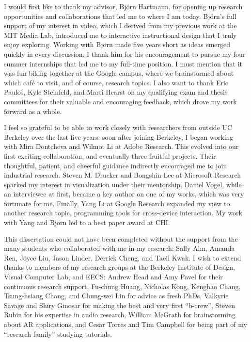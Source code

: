 \begin{acknowledgements}

I would first like to thank my advisor, Bj\"orn Hartmann, for opening up research opportunities and collaborations that led me to where I am today.
%
Bj\"orn's full support of my interest in video, which I derived from my previous work at the MIT Media Lab, introduced me to interactive instructional design that I truly enjoy exploring. Working with Bj\"orn made five years short as ideas emerged quickly in every discussion. I thank him for his encouragement to pursue my four summer internships that led me to my full-time position. I must mention that it was fun biking together at the Google campus, where we brainstormed about which caf\'{e} to visit, and of course, research topics.
I also want to thank Eric Paulos, Kyle Steinfeld, and Marti Hearst on my qualifying exam and thesis committees for their valuable and encouraging feedback, which drove my work forward as a whole.

I feel so grateful to be able to work closely with researchers from outside UC Berkeley over the last five years: soon after joining Berkeley, I began working with Mira Dontcheva and Wilmot Li at Adobe Research. This evolved into our first exciting collaboration, and eventually three fruitful projects. Their thoughtful, patient, and cheerful guidance indirectly encouraged me to join industrial research.
%
Steven M. Drucker and Bongshin Lee at Microsoft Research sparked my interest in visualization under their mentorship.
%
Daniel Vogel, while an interviewee at first, became a key author on one of my works, which was very fortunate for me.
%
Finally, Yang Li at Google Research expanded my view to another research topic, programming tools for cross-device interaction. My work with Yang and Bj\"orn led to a best paper award at CHI.

This dissertation could not have been completed without the support from the many students who collaborated with me in my research: Sally Ahn, Amanda Ren, Joyce Liu, Jason Linder, Derrick Cheng, and Taeil Kwak. I wish to extend thanks to members of my research groups at the Berkeley Institute of Design, Visual Computer Lab, and EECS: Andrew Head and Amy Pavel for their continuous research support, Fu-chung Huang, Nicholas Kong, Kenghao Chang, Tsung-hsiang Chang, and Chung-wei Lin for advice as fresh PhDs, Valkyrie Savage and Shiry Ginosar for making the best and very first ``b-crew'', Steven Rubin for his expertise in audio research, William McGrath for brainstorming about AR applications, and Cesar Torres and Tim Campbell for being part of my ``research family'' studying tutorials.


\end{acknowledgements}
